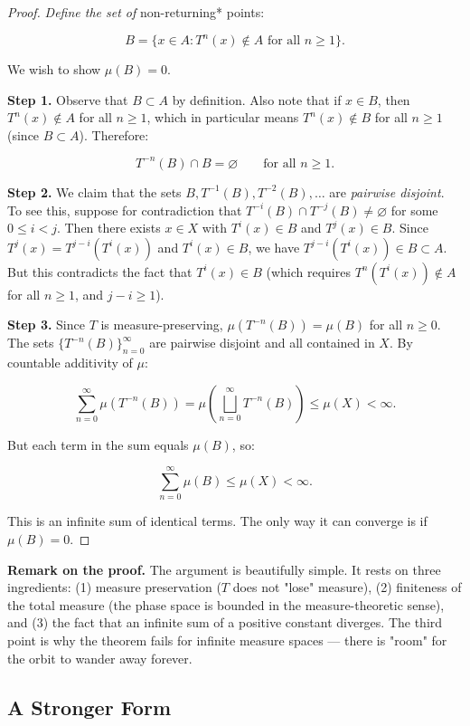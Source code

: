 \begin{proof}
\textit{ Define the set of }non-returning* points:

\[
B = \{x \in A : T^n(x) \notin A \text{ for all } n \geq 1\}.
\]

We wish to show $\mu(B) = 0$.

\textbf{Step 1.} Observe that $B \subset A$ by definition. Also note that if $x \in B$, then $T^n(x) \notin A$ for all $n \geq 1$, which in particular means $T^n(x) \notin B$ for all $n \geq 1$ (since $B \subset A$). Therefore:

\[
T^{-n}(B) \cap B = \varnothing \qquad \text{for all } n \geq 1.
\]

\textbf{Step 2.} We claim that the sets $B, T^{-1}(B), T^{-2}(B), \ldots$ are \textit{pairwise disjoint}. To see this, suppose for contradiction that $T^{-i}(B) \cap T^{-j}(B) \neq \varnothing$ for some $0 \leq i < j$. Then there exists $x \in X$ with $T^i(x) \in B$ and $T^j(x) \in B$. Since $T^j(x) = T^{j-i}(T^i(x))$ and $T^i(x) \in B$, we have $T^{j-i}(T^i(x)) \in B \subset A$. But this contradicts the fact that $T^i(x) \in B$ (which requires $T^n(T^i(x)) \notin A$ for all $n \geq 1$, and $j - i \geq 1$).

\textbf{Step 3.} Since $T$ is measure-preserving, $\mu(T^{-n}(B)) = \mu(B)$ for all $n \geq 0$. The sets $\{T^{-n}(B)\}_{n=0}^{\infty}$ are pairwise disjoint and all contained in $X$. By countable additivity of $\mu$:

\[
\sum_{n=0}^{\infty} \mu(T^{-n}(B)) = \mu\!\left(\bigsqcup_{n=0}^{\infty} T^{-n}(B)\right) \leq \mu(X) < \infty.
\]

But each term in the sum equals $\mu(B)$, so:

\[
\sum_{n=0}^{\infty} \mu(B) \leq \mu(X) < \infty.
\]

This is an infinite sum of identical terms. The only way it can converge is if $\mu(B) = 0$.
\end{proof}


\textbf{Remark on the proof.} The argument is beautifully simple. It rests on three ingredients: (1) measure preservation ($T$ does not "lose" measure), (2) finiteness of the total measure (the phase space is bounded in the measure-theoretic sense), and (3) the fact that an infinite sum of a positive constant diverges. The third point is why the theorem fails for infinite measure spaces --- there is "room" for the orbit to wander away forever.

\subsection{A Stronger Form}\label{sec:4.4.3}

